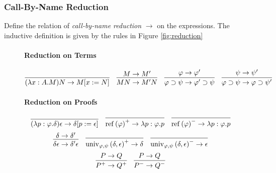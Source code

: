 \documentclass[a4paper,UKenglish]{lipics-v2016}
\newcommand*{\reff}[1]{\ensuremath{\mathrm{ref} \left( {#1} \right)}}
\newcommand*{\univ}[4]{\ensuremath{\mathrm{univ}_{{#1}, {#2}} \left({#3} , {#4} \right)}}
\theoremstyle{plain}
\theoremstyle{definition}
\begin{document}
\subsubsection{Call-By-Name Reduction}

\begin{definition}
Define the relation of \emph{call-by-name reduction} $\rightarrow$ on the expressions.  The inductive
definition is given by the rules in Figure \ref{fig:reduction}

\begin{figure}
\paragraph*{Reduction on Terms}
$$ \infer{(\lambda x:A.M)N \rightarrow M[x:=N]}{} \quad
\infer{MN \rightarrow M'N}{M \rightarrow M'} \quad
\infer{\varphi \supset \psi \rightarrow \varphi' \supset \psi}{\varphi \rightarrow \varphi'} \quad
\infer{\varphi \supset \psi \rightarrow \varphi \supset \psi'}{\psi \rightarrow \psi'} $$
\paragraph*{Reduction on Proofs}
$$\infer{(\lambda p : \varphi . \delta)\epsilon \rightarrow \delta [ p := \epsilon ]}{} \quad
\infer{\reff{\varphi}^+ \rightarrow \lambda p : \varphi . p}{} \quad
\infer{\reff{\varphi}^- \rightarrow \lambda p : \varphi . p}{} $$
$$ \infer{\delta \epsilon \rightarrow \delta' \epsilon}{\delta \rightarrow \delta'} \quad
\infer{\univ{\varphi}{\psi}{\delta}{\epsilon}^+ \rightarrow \delta}{} \quad
\infer{\univ{\varphi}{\psi}{\delta}{\epsilon}^- \rightarrow \epsilon}{} $$
$$ \infer{P^+ \rightarrow Q^+}{P \rightarrow Q} \quad
\infer{P^- \rightarrow Q^-}{P \rightarrow Q}$$

\end{figure}
\end{definition}
\end{document}
